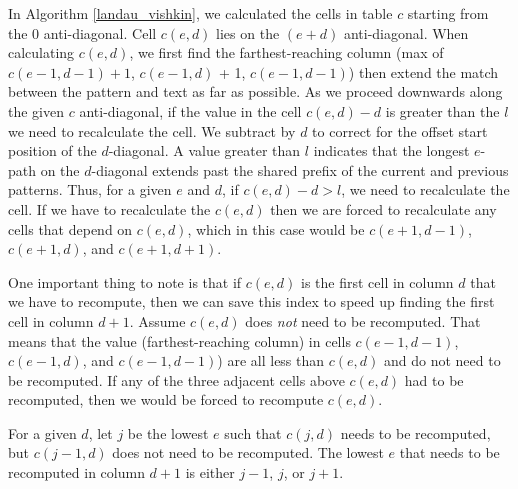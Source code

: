 In Algorithm \ref{landau_vishkin}, we calculated the cells in table $c$ starting from the 0 anti-diagonal.  Cell $c(e,d)$ lies on the $(e+d)$ anti-diagonal.
When calculating $c(e,d)$, we first find the farthest-reaching column (max of $c(e-1,d-1) + 1$, $c(e-1,d)$ + 1, $c(e-1,d-1)$) then extend the match between the pattern and text as far as possible.
As we proceed downwards along the given $c$ anti-diagonal, if the value in the cell $c(e,d) - d$ is greater than the $l$ we need to recalculate the cell.
We subtract by $d$ to correct for the offset start position of the $d$-diagonal.
A value greater than $l$ indicates that the longest $e$-path on the $d$-diagonal extends past the shared prefix of the current and previous patterns.
Thus, for a given $e$ and $d$, if $c(e,d) - d > l$, we need to recalculate the cell.
If we have to recalculate the $c(e,d)$ then we are forced to recalculate any cells that depend on $c(e,d)$, which in this case would be $c(e+1, d-1)$, $c(e+1, d)$, and $c(e+1, d+1)$.

One important thing to note is that if $c(e,d)$ is the first cell in column $d$ that we have to recompute, then we can save this index to speed up finding the first cell in column $d+1$.
Assume $c(e,d)$ does \emph{not} need to be recomputed.
That means that the value (farthest-reaching column) in cells $c(e-1,d-1)$, $c(e-1,d)$, and $c(e-1,d-1)$) are all less than $c(e,d)$ and do not need to be recomputed.
If any of the three adjacent cells above $c(e,d)$ had to be recomputed, then we would be forced to recompute $c(e,d)$.

\begin{theorem}
For a given $d$, let $j$ be the lowest $e$ such that $c(j,d)$ needs to be recomputed, but $c(j-1,d)$ does not need to be recomputed. The lowest $e$ that needs to be recomputed in column $d+1$ is either $j-1$, $j$, or $j+1$.
\end{theorem}

